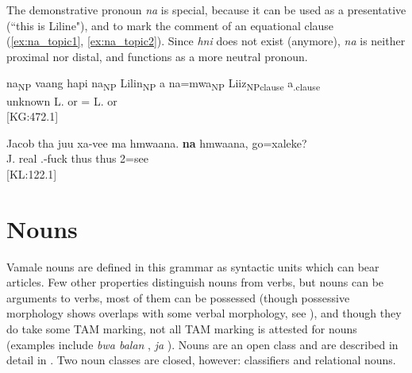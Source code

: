 
The demonstrative pronoun \textit{na} is special, because it can be used as a presentative (``this is Liline"), and to mark the comment of an equational clause (\ref{ex:na_topic1}, \ref{ex:na_topic2}). Since \textit{hni} does not exist (anymore), \textit{na} is neither proximal nor distal, and functions as a more neutral pronoun.


\ea\label{ex:na_topic1}
\gll {{\ob}}na{\cb}\textsubscript{{\upshape NP}} {\ob}vaang {\ob}hapi {\ob}{\ob}na{\cb}\textsubscript{{\upshape NP}}{\cb} {\ob}Lilin{\cb}\textsubscript{{\upshape NP}} a {\ob}{\ob}na=mwa{\cb}\textsubscript{{\upshape NP}} {\ob}Liiz{\cb}\textsubscript{{\upshape NP}}{\cb}\textsubscript{{\upshape clause}} a{\cb}\textsubscript{{\upshape{}.clause}}{\cb}\\
  unknown   L. or = L. or\\
\glt {} {[KG:472.1]}
\z

\ea\label{ex:na_topic2}
\gll Jacob tha juu xa-vee ma hmwaana. \textbf{na} hmwaana, go=xaleke?\\
 J.  real .-fuck  thus  thus 2=see\\
\glt {} {[KL:122.1]}
\z

\section{Nouns}
\label{sec:WC_nouns}

Vamale nouns are defined in this grammar as syntactic units which can bear articles. Few other properties distinguish nouns from verbs, but nouns can be arguments to verbs, %
most of them can be possessed (though possessive morphology shows overlaps with some verbal morphology, see ), and though they do take some TAM marking, not all TAM marking is attested for nouns (examples include \textit{bwa balan} , \textit{ja} ). Nouns are an open class and are described in detail in . Two noun classes are closed, however: classifiers and relational nouns.

